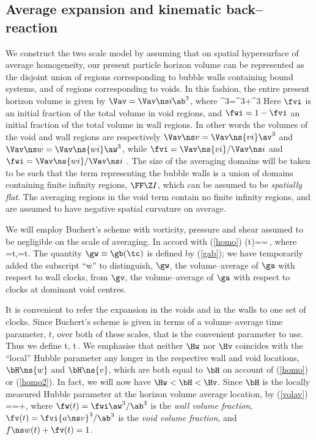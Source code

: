 \documentclass[12pt]{iopart}
\begin{document}
\subsection{Average expansion and kinematic back--reaction}
We construct the two scale model by assuming that on spatial hypersurface
of average homogeneity, our present particle horizon volume
can be represented as the disjoint union of regions corresponding to bubble
walls containing bound systems, and of regions corresponding to voids. In
this fashion, the entire present horizon volume is given by $\Vav=\Vav\ns i
\ab^3$, where
\beq\ab^3=\fwi\aw^3+\fvi\av^3\label{volav}\eeq
Here $\fvi$ is an initial fraction of the total volume in void regions,
and $\fwi=1-\fvi$ an initial fraction of the total volume in wall regions.
In other words the volumes of the void and wall regions are respectively
$\Vav\ns v=\Vav\ns{vi}\av^3$ and $\Vav\ns w=\Vav\ns{wi}\aw^3$, while
$\fvi=\Vav\ns{vi}/\Vav\ns i$ and $\fwi=\Vav\ns{wi}/\Vav\ns i$ .
The size of the averaging domains will be taken to be such that the
term representing the bubble walls is a union of domains containing finite
infinity regions, $\FF\Z I$, which can be assumed to be {\em spatially flat}.
The averaging regions in the void term contain no finite infinity regions,
and are assumed to have negative spatial curvature on average.

We will employ Buchert's scheme with vorticity, pressure and shear
assumed to be negligible on the scale of averaging. In accord with
(\ref{homo})
\beq\bH(t)==\,,\label{homo2}\eeq
where
\beq\gw=\Deriv\dd\tw t,\qquad{}\qquad\gv=\Deriv\dd\tv t.\label{clocks1}
\eeq
The quantity $\gw\equiv\gb(\tc)$ is defined by (\ref{gab}); we have
temporarily added the subscript ``w'' to distinguish, $\gw$, the
volume--average of $\ga$ with respect to wall clocks, from $\gv$, the
volume--average of $\ga$ with respect to clocks at dominant void centres.

It is convenient to refer the expansion in the voids and in the walls
to one set of clocks. Since Buchert's scheme is given in terms of a
volume--average time parameter, $t$, over both of these scales, that is
the convenient parameter to use. Thus we define
\beq\Hw\equiv{1\over\aw}\Deriv\dd t\aw,\qquad{}\qquad
\Hv\equiv{1\over\av}\Deriv\dd t\av\,.\label{homo3}\eeq
We emphasise that neither $\Hw$ nor $\Hv$ coincides with the ``local''
Hubble parameter any longer in the respective wall and void locations,
$\bH\ns{w}$ and $\bH\ns{v}$, which
are both equal to $\bH$ on account of (\ref{homo}) or (\ref{homo2}). In
fact, we will now have $\Hw<\bH<\Hv$. Since $\bH$ is the locally
measured Hubble parameter at the horizon volume average location, by
(\ref{volav})
\beq\bH=\ave\th{}=\fw\Hw+\fv\Hv,\label{Hback}\eeq
where $\fw(t)=\fwi\aw^3/\ab^3$ is the {\em wall volume fraction},
$\fv(t)=\fvi{a\ns v}^3/\ab^3$ is the {\em void volume fraction},
and $f\ns w(t)+\fv(t)=1$.
\end{document}
